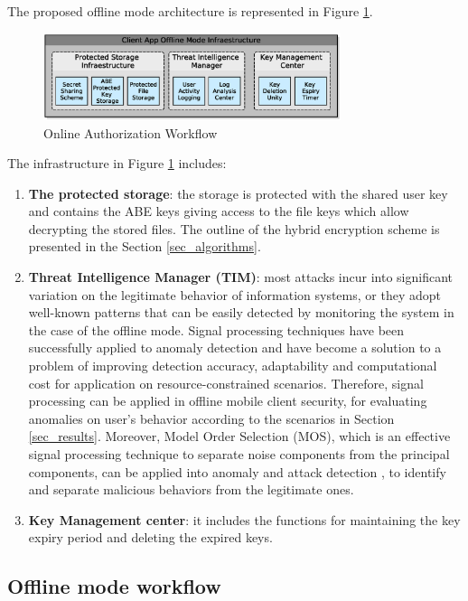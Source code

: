 \documentclass[twocolumn]{svjour3}          %
\begin{document}
The proposed offline mode architecture is represented in Figure \ref{fig:5}.

\begin{figure}[h!]
	\centering
	\includegraphics[width=8.7cm]{figures/offlinesecurityarchitecture.eps}
	\caption{Online Authorization Workflow}
	\label{fig:5}
\end{figure}

The infrastructure in Figure \ref{fig:5} includes:

\begin{enumerate}
	\item \textbf{The protected storage}: the storage is protected with the shared user key and contains the ABE keys giving access to the file keys which allow decrypting the stored files. The outline of the hybrid encryption scheme is presented in the Section \ref{sec_algorithms}.
	\item \textbf{Threat Intelligence Manager (TIM)}: most attacks incur into significant variation on the legitimate behavior of information systems, or they adopt well-known patterns that can be easily detected by monitoring the system in the case of the offline mode. Signal processing techniques have been successfully applied to anomaly detection \cite{lu2009network, huang2009signal} and have become a solution to a problem of improving detection accuracy, adaptability and computational cost for application on resource-constrained scenarios. Therefore, signal processing can be applied in offline mobile client security, for evaluating anomalies on user's behavior according to the scenarios in Section \ref{sec_results}. Moreover, Model Order Selection (MOS), which is an effective signal processing technique to separate noise components from the principal components, can be applied into anomaly and attack detection \cite{tenorio2013greatest}, to identify and separate malicious behaviors from the legitimate ones.
	\item \textbf{Key Management center}: it includes the functions for maintaining the key expiry period and deleting the expired keys. 
\end{enumerate}

\subsection{Offline mode workflow}
\label{sec_offline_mode_workflow}
\end{document}
